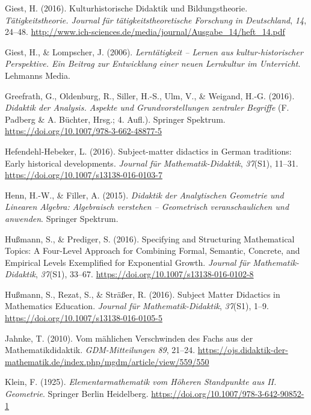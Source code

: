 \documentclass[
]{scrbook}
\newlength{\cslhangindent}
\newenvironment{CSLReferences}[2] %
 {\begin{list}{}{%
  \setlength{\itemindent}{0pt}
  \setlength{\leftmargin}{0pt}
  \setlength{\parsep}{0pt}
  \ifodd #1
   \setlength{\leftmargin}{\cslhangindent}
   \setlength{\itemindent}{-1\cslhangindent}
  \fi
  \setlength{\itemsep}{#2\baselineskip}}}
 {\end{list}}
\theoremstyle{definition}
\theoremstyle{definition}
\theoremstyle{definition}
\theoremstyle{definition}
\theoremstyle{remark}
\begin{document}
\begin{CSLReferences}{1}{0}
Giest, H. (2016). Kulturhistorische {Didaktik} und {Bildungstheorie}. \emph{Tätigkeitstheorie. Journal für tätigkeitstheoretische Forschung in Deutschland}, \emph{14}, 24--48. \url{http://www.ich-sciences.de/media/journal/Ausgabe_14/heft_14.pdf}

Giest, H., \& Lompscher, J. (2006). \emph{Lerntätigkeit -- {Lernen} aus kultur-historischer {Perspektive}. {Ein} {Beitrag} zur {Entwicklung} einer neuen {Lernkultur} im {Unterricht}}. Lehmanns Media.

Greefrath, G., Oldenburg, R., Siller, H.-S., Ulm, V., \& Weigand, H.-G. (2016). \emph{Didaktik der {Analysis}. {Aspekte} und {Grundvorstellungen} zentraler {Begriffe}} (F. Padberg \& A. Büchter, Hrsg.; 4. Aufl.). Springer Spektrum. \url{https://doi.org/10.1007/978-3-662-48877-5}

Hefendehl-Hebeker, L. (2016). Subject-matter didactics in {German} traditions: {Early} historical developments. \emph{Journal für Mathematik-Didaktik}, \emph{37}(S1), 11--31. \url{https://doi.org/10.1007/s13138-016-0103-7}

Henn, H.-W., \& Filler, A. (2015). \emph{Didaktik der {Analytischen} {Geometrie} und {Linearen} {Algebra}: {Algebraisch} verstehen -- {Geometrisch} veranschaulichen und anwenden}. Springer Spektrum.

Hußmann, S., \& Prediger, S. (2016). Specifying and Structuring Mathematical Topics: A Four-Level Approach for Combining Formal, Semantic, Concrete, and Empirical Levels Exemplified for Exponential Growth. \emph{Journal für Mathematik-Didaktik}, \emph{37}(S1), 33--67. \url{https://doi.org/10.1007/s13138-016-0102-8}

Hußmann, S., Rezat, S., \& Sträßer, R. (2016). Subject {Matter} {Didactics} in {Mathematics} {Education}. \emph{Journal für Mathematik-Didaktik}, \emph{37}(S1), 1--9. \url{https://doi.org/10.1007/s13138-016-0105-5}

Jahnke, T. (2010). Vom mählichen {Verschwinden} des {Fachs} aus der {Mathematikdidaktik}. \emph{GDM-Mitteilungen 89}, 21--24. \url{https://ojs.didaktik-der-mathematik.de/index.php/mgdm/article/view/559/550}

Klein, F. (1925). \emph{Elementarmathematik vom {Höheren} {Standpunkte} aus {II}. {Geometrie}}. Springer Berlin Heidelberg. \url{https://doi.org/10.1007/978-3-642-90852-1}


\end{CSLReferences}
\end{document}
